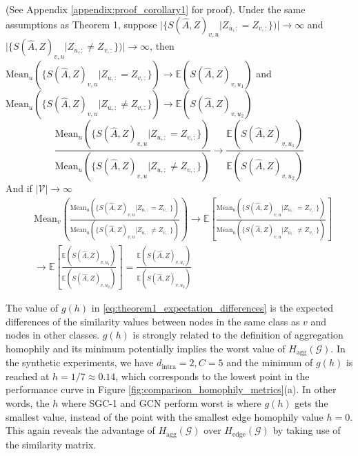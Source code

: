 \documentclass{article}
\newcommand{\0}{{\boldsymbol{0}}}
\newcommand{\6}{{\partial}}
\newcommand{\8}{{\infty}}
\newcommand{\4}{{\nabla}}
\newenvironment{corollary}[2][Corollary]{\begin{trivlist}
		\item[\hskip \labelsep {\bfseries #1}\hskip \labelsep {\bfseries #2.}]}{\end{trivlist}}
\begin{document}
\begin{corollary} 1
(See Appendix \ref{appendix:proof_corollary1} for proof).
Under the same assumptions as Theorem 1, suppose $\Big| \{S(\hat{A},Z)_{v,u} |Z_{u,:}=Z_{v,:} \}) \Big| \rightarrow \infty$ and $\Big| \{S(\hat{A},Z)_{v,u} |Z_{u,:} \neq Z_{v,:} \}) \Big| \rightarrow \infty$, then $\mathrm{Mean}_u(\{S(\hat{A},Z)_{v,u} |Z_{u,:}=Z_{v,:} \}) \rightarrow \mathbb{E}\left(S(\hat{A},Z)_{v,u_1}  \right) $ and $\mathrm{Mean}_u(\{S(\hat{A},Z)_{v,u} |Z_{u,:} \neq Z_{v,:} \}) \rightarrow \mathbb{E}\left(S(\hat{A},Z)_{v,u_2}  \right) $
\begin{equation}
\frac{\mathrm{Mean}_u(\{S(\hat{A},Z)_{v,u} |Z_{u,:}=Z_{v,:} \})}{\mathrm{Mean}_u(\{S(\hat{A},Z)_{v,u} |Z_{u,:} \neq Z_{v,:} \})} \rightarrow
\frac{\mathbb{E}\left(S(\hat{A},Z)_{v,u_1}  \right) }
    {\mathbb{E}\left(S(\hat{A},Z)_{v,u_2}  \right)}
\end{equation}
And if $| \mathcal{V}| \rightarrow \infty$
\begin{align*}
    &\mathrm{Mean}_v \left( \frac{\mathrm{Mean}_u(\{S(\hat{A},Z)_{v,u} |Z_{u,:}=Z_{v,:} \})}{\mathrm{Mean}_u(\{S(\hat{A},Z)_{v,u} |Z_{u,:} \neq Z_{v,:} \})} \right) \rightarrow \mathbb{E} \left[\frac{\mathrm{Mean}_u(\{S(\hat{A},Z)_{v,u} |Z_{u,:}=Z_{v,:} \})}{\mathrm{Mean}_u(\{S(\hat{A},Z)_{v,u} |Z_{u,:} \neq Z_{v,:} \})} \right]\\
    & \rightarrow \mathbb{E}\left[ \frac{\mathbb{E}\left(S(\hat{A},Z)_{v,u_1}  \right) }
    {\mathbb{E}\left(S(\hat{A},Z)_{v,u_2}  \right)}\right] = \frac{\mathbb{E}\left(S(\hat{A},Z)_{v,u_1}  \right) }
    {\mathbb{E}\left(S(\hat{A},Z)_{v,u_2}  \right)}
\end{align*}
\end{corollary} 
\fi
The value of $g(h)$ in \eqref{eq:theorem1_expectation_differences} is the expected differences of the similarity values between nodes in the same class as $v$ and nodes in other classes. $g(h)$ is strongly related to the definition of aggregation homophily and its minimum potentially implies the worst value of $H_{\text{agg}}(\mathcal{G})$. In the synthetic experiments, we have $d_{\text{intra}} = 2, C=5$ and the minimum of $g(h)$ is reached at $h = 1/7 \approx 0.14$, which corresponds to the lowest point in the performance curve in Figure \ref{fig:comparison_homophily_metrics}(a). In other words, the $h$ where SGC-1 and GCN perform worst is where $g(h)$ gets the smallest value, instead of the point with the smallest edge homophily value $h=0$. This again reveals the advantage of $H_{\text{agg}}(\mathcal{G})$ over $H_\text{edge}(\mathcal{G})$ by taking use of the similarity matrix.
\iffalse
\end{document}
